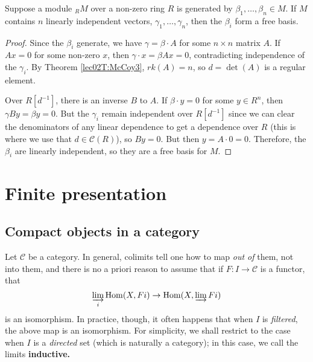  \begin{corollary}
   Suppose a module ${}_RM$ over a non-zero ring $R$ is generated by $\beta_1,\dots,
   \beta_n\in M$. If $M$ contains $n$ linearly independent vectors, $\gamma_1,\dots,
   \gamma_n$, then the $\beta_i$ form a free basis.
 \end{corollary}
 \begin{proof}
   Since the $\beta_i$ generate, we have $\gamma = \beta\cdot A$ for some $n\times n$
   matrix $A$. If $Ax=0$ for some non-zero $x$, then $\gamma \cdot x = \beta Ax = 0$,
   contradicting independence of the $\gamma_i$. By Theorem \ref{lec02T:McCoy3},
   $rk(A)=n$, so $d=\det(A)$ is a regular element.

   Over $R[d^{-1}]$, there is an inverse $B$ to $A$. If $\beta\cdot
   y=0$ for some $y\in R^n$, then $\gamma By = \beta y=0$. But the $\gamma_i$ remain
   independent over $R[d^{-1}]$ since we can clear the denominators of any linear
   dependence to get a dependence over $R$ (this is where we use that $d\in \mathcal{C}(R)$), so
   $By=0$. But then $y=A\cdot 0 = 0$. Therefore, the $\beta_i$ are linearly independent,
   so they are a free basis for $M$.
\end{proof}

\section{Finite presentation}

\subsection{Compact objects in a category}

Let $\mathcal{C}$ be a category.
In general, colimits tell one how to map \emph{out of} them, not into them,
and there is no a priori reason to assume that if $F: I \to \mathcal{C}$ is a
functor, that
\begin{equation} \label{filtcolimhom} \varinjlim_i \hom(X, Fi) \to \hom(X,
\varinjlim Fi)  \end{equation}
is an isomorphism.
In practice, though, it often happens that when $I$ is 
\emph{filtered}, the above map is an isomorphism. For simplicity, we shall
restrict to the case when $I$ is a \emph{directed }set
(which is naturally a category); in this case, we call the limits
\textbf{inductive.}


